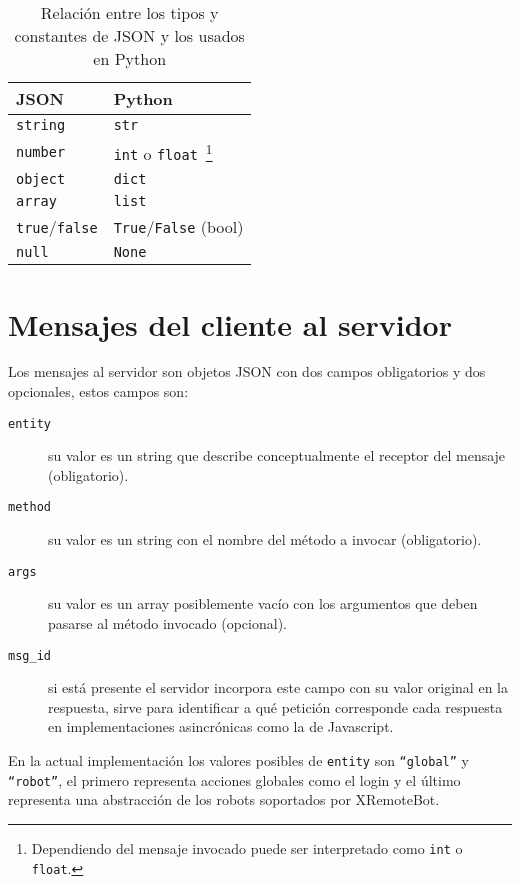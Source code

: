 \begin{table}
    \centering
    \begin{tabu}{l|l}
        JSON & Python \\
        \hline
        \texttt{string} & \texttt{str} \\
        \texttt{number} & \texttt{int} o \texttt{float}~\footnote{Dependiendo
        del mensaje invocado
        puede ser interpretado como \texttt{int} o \texttt{float}.}\\
        \texttt{object} & \texttt{dict} \\
        \texttt{array}  & \texttt{list} \\
        \texttt{true}/\texttt{false} & \texttt{True}/\texttt{False} (bool) \\
        \texttt{null} & \texttt{None} \\
    \end{tabu}
    \caption{Relación entre los tipos y constantes de JSON y los usados en
    Python}
    \label{tbl:rel_json_python}
\end{table}

\section{Mensajes del cliente al servidor}

Los mensajes al servidor son objetos JSON con dos campos obligatorios y dos
opcionales, estos campos son:

\begin{description}
    \item[\texttt{entity}] su valor es un string que describe conceptualmente
        el receptor del mensaje (obligatorio).
    \item[\texttt{method}] su valor es un string con el nombre del método a
        invocar (obligatorio).
    \item[\texttt{args}] su valor es un array posiblemente vacío con los
        argumentos que deben pasarse al método invocado (opcional).
    \item[\texttt{msg\_id}] si está presente el servidor incorpora este
        campo con su valor original en la respuesta, sirve para identificar a
        qué petición
        corresponde cada respuesta en implementaciones asincrónicas
        como la de Javascript.
\end{description}

En la actual implementación los valores posibles de \texttt{entity} son
\texttt{``global''} y \texttt{``robot''}, el primero
representa acciones globales como el login y el último representa una
abstracción de los robots soportados por XRemoteBot.

